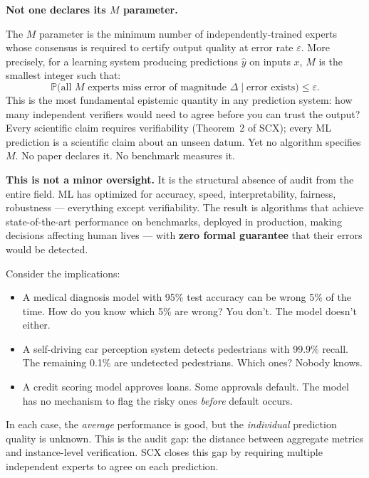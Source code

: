 \documentclass[12pt,a4paper]{article}
\theoremstyle{definition}
\newcommand{\SCX}{\textsc{SCX}}
\newcommand{\Pbb}{\mathbb{P}}
\begin{document}
\textbf{Not one declares its $M$ parameter.}

The $M$ parameter is the minimum number of independently-trained experts whose consensus is required to certify output quality at error rate $\varepsilon$. More precisely, for a learning system producing predictions $\hat{y}$ on inputs $x$, $M$ is the smallest integer such that:
\begin{equation}\label{eq:M_def}
    \Pbb\bigl(\text{all } M \text{ experts miss error of magnitude } \Delta \mid \text{error exists}\bigr) \le \varepsilon.
\end{equation}
This is the most fundamental epistemic quantity in any prediction system: how many independent verifiers would need to agree before you can trust the output? Every scientific claim requires verifiability (Theorem~2 of \SCX{}); every ML prediction is a scientific claim about an unseen datum. Yet no algorithm specifies $M$. No paper declares it. No benchmark measures it.

\medskip
\noindent\textbf{This is not a minor oversight.} It is the structural absence of audit from the entire field. ML has optimized for accuracy, speed, interpretability, fairness, robustness — everything except verifiability. The result is algorithms that achieve state-of-the-art performance on benchmarks, deployed in production, making decisions affecting human lives — with \textbf{zero formal guarantee} that their errors would be detected.

Consider the implications:
\begin{itemize}[nosep]
    \item A medical diagnosis model with 95\% test accuracy can be wrong 5\% of the time. How do you know which 5\% are wrong? You don't. The model doesn't either.
    \item A self-driving car perception system detects pedestrians with 99.9\% recall. The remaining 0.1\% are undetected pedestrians. Which ones? Nobody knows.
    \item A credit scoring model approves loans. Some approvals default. The model has no mechanism to flag the risky ones \textit{before} default occurs.
\end{itemize}

In each case, the \textit{average} performance is good, but the \textit{individual} prediction quality is unknown. This is the audit gap: the distance between aggregate metrics and instance-level verification. \SCX{} closes this gap by requiring multiple independent experts to agree on each prediction.
\end{document}
